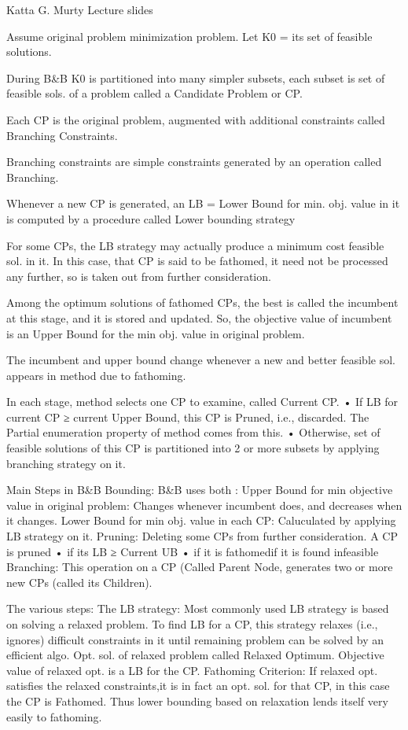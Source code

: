 

Katta G. Murty Lecture slides

Assume original problem minimization problem. Let K0 = its set of feasible solutions.

During B&B K0 is partitioned into many simpler subsets, each
subset is set of feasible sols. of a problem called a Candidate Problem or CP.

Each CP is the original problem, augmented with additional
constraints called Branching Constraints.

Branching constraints are simple constraints generated by an
operation called Branching.

Whenever a new CP is generated, an LB = Lower Bound for min. obj. value in it is computed by a procedure called Lower bounding strategy

For some CPs, the LB strategy may actually produce a minimum cost feasible sol. in it. In this case, that CP is said to be fathomed, it need not be processed any further, so is taken out
from further consideration.

Among the optimum solutions of fathomed CPs, the best is called the incumbent at this stage, and it is stored and updated.
So, the objective value of incumbent is an Upper Bound for the min obj. value in original problem.

The incumbent and upper bound change whenever a new and
better feasible sol. appears in method due to fathoming.

In each stage, method selects one CP to examine, called Current
CP.
• If LB for current CP ≥ current Upper Bound, this CP is
Pruned, i.e., discarded. The Partial enumeration property
of method comes from this.
• Otherwise, set of feasible solutions of this CP is partitioned
into 2 or more subsets by applying branching strategy on it.

Main Steps in B&B
Bounding: B&B uses both :
Upper Bound for min objective value in original
problem: Changes whenever incumbent does, and decreases
when it changes.
Lower Bound for min obj. value in each CP: Caluculated
by applying LB strategy on it.
Pruning: Deleting some CPs from further consideration. A
CP is pruned
• if its LB ≥ Current UB
• if it is fathomedif it is found infeasible
Branching: This operation on a CP (Called Parent Node,
generates two or more new CPs (called its Children).

The various steps:
The LB strategy: Most commonly used LB strategy is based
on solving a relaxed problem.
To find LB for a CP, this strategy relaxes (i.e., ignores) difficult
constraints in it until remaining problem can be solved by an
efficient algo. Opt. sol. of relaxed problem called Relaxed
Optimum. Objective value of relaxed opt. is a LB for the CP.
Fathoming Criterion: If relaxed opt. satisfies the relaxed
constraints,it is in fact an opt. sol. for that CP, in this case
the CP is Fathomed. Thus lower bounding based on relaxation
lends itself very easily to fathoming.

